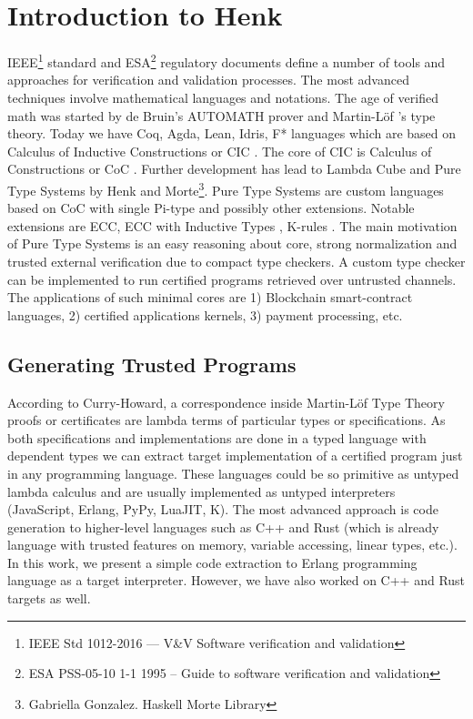 \documentclass{article}
\begin{document}
\section{Introduction to Henk}
IEEE\footnote{IEEE Std 1012-2016  --- V\&V Software verification and validation} standard
and ESA\footnote{ESA PSS-05-10 1-1 1995 -- Guide to software verification and validation} regulatory documents define a number of tools and approaches for verification and validation processes. 
The most advanced techniques involve mathematical languages and notations.
The age of verified math was started by de Bruin's AUTOMATH prover and Martin-Löf \cite{Lof84}'s type theory.
Today we have Coq, Agda, Lean, Idris, F* languages which are based on Calculus of Inductive Constructions or CIC \cite{Mohring15}.
The core of CIC is Calculus of Constructions or CoC \cite{Coq88}.
Further development has lead to Lambda Cube \cite{Henk93} and Pure Type Systems by Henk \cite{Erik97} and Morte\footnote{Gabriella Gonzalez. Haskell Morte Library}.
Pure Type Systems are custom languages based on CoC with single Pi-type and possibly other extensions.
Notable extensions are ECC, ECC with Inductive Types \cite{Ore92}, K-rules \cite{Barthe95}.
The main motivation of Pure Type Systems is an easy reasoning about core, strong normalization and trusted external verification due to compact type checkers.
A custom type checker can be implemented to run certified programs retrieved over untrusted channels.
The applications of such minimal cores are 1) Blockchain smart-contract languages, 2) certified applications kernels, 3) payment processing, etc.

\subsection{Generating Trusted Programs}
According to Curry-Howard, a correspondence inside Martin-Löf Type Theory \cite{Lof84} proofs or certificates are lambda terms of particular types or specifications.
As both specifications and implementations are done in a typed language with dependent types we can extract target implementation of a certified program just in any programming language.
These languages could be so primitive as untyped lambda calculus and are usually implemented as untyped interpreters (JavaScript, Erlang, PyPy, LuaJIT, K).
The most advanced approach is code generation to higher-level languages such as C++ and Rust (which is already language with trusted features on memory, variable accessing, linear types, etc.).
In this work, we present a simple code extraction to Erlang programming language as a target interpreter.
However, we have also worked on C++ and Rust targets as well.
\end{document}
